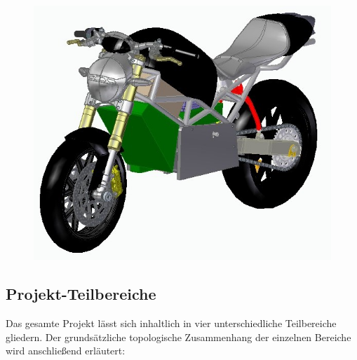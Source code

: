 \begin{figure} [H]
	\begin{center}
		\includegraphics[scale=0.7] {figures/mechanik/Ducati2.jpg}
	\end{center}
\end{figure}

\newpage


\subsection{Projekt-Teilbereiche}
Das gesamte Projekt lässt sich inhaltlich in vier unterschiedliche Teilbereiche gliedern. Der grundsätzliche topologische Zusammenhang der einzelnen Bereiche wird anschließend erläutert:

